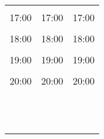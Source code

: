 \documentclass[10pt,a5paper]{book}
\begin{document}
{\begin{flushleft}
\begin{tabular}{p{}|p{}|p{}}
      \dotfill & \dotfill & \dotfill \\
      17:00 \dotfill & 17:00 \dotfill & 17:00 \dotfill \\
      \dotfill & \dotfill & \dotfill \\
      18:00 \dotfill & 18:00 \dotfill & 18:00 \dotfill \\
      \dotfill & \dotfill & \dotfill \\
      19:00 \dotfill & 19:00 \dotfill & 19:00 \dotfill \\
      \dotfill & \dotfill & \dotfill \\
      20:00 \dotfill & 20:00 \dotfill & 20:00 \dotfill \\
      \dotfill & \dotfill & \dotfill \\
      & & \\
      \dotfill & \dotfill & \dotfill \\
      \dotfill & \dotfill & \dotfill \\
      \dotfill & \dotfill & \dotfill \\
      \dotfill & \dotfill & \dotfill \\
      \dotfill & \dotfill & \dotfill \\
      \dotfill & \dotfill & \dotfill \\
      \dotfill & \dotfill & \dotfill \\
      \dotfill & \dotfill & \dotfill \\
      \dotfill & \dotfill & \dotfill \\
      \dotfill & \dotfill & \dotfill \\
    \end{tabular}
  \end{flushleft}
}
\end{document}
